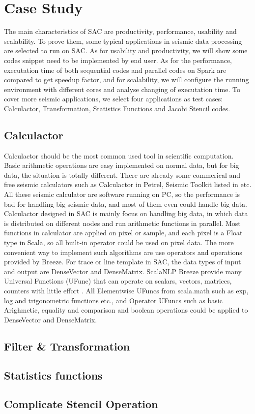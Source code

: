 \section{Case Study}
The main characteristics of SAC are productivity, performance, usability and scalability. To prove them, some typical applications in seismic data processing are selected to run on SAC. As for usability and productivity, we will show some codes snippet need to be implemented by end user. As for the performance, executation time of both sequential codes and parallel codes on Spark are compared to get speedup factor, and for scalability, we will configure the running environment with different cores and analyse changing of executation time. To cover more seismic applications, we select four applications as test cases: Calculactor, Transformation, Statistics Functions and Jacobi Stencil codes.

\subsection{Calculactor}
Calculactor should be the most common used tool in scientific computation. Basic arithmetic operations are easy implemented on normal data, but for big data, the situation is totally different. There are already some commerical and free seismic calculators such as Calculactor in Petrel, Seismic Toolkit listed in \cite{SeismicCalculator} etc. All these seismic calculator are software running on PC, so the performance is bad for handling big seismic data, and most of them even could handle big data. Calculactor designed in SAC is mainly focus on handling big data, in which data is distributed on different nodes and run arithmetic functions in parallel. Most functions in calculator are applied on pixel or sample, and each pixel is a Float type in Scala, so all built-in operator could be used on pixel data. The more convenient way to implement such algorithms are use operators and operations provided by Breeze. For trace or line template in SAC, the data types of input and output are DenseVector and DenseMatrix. ScalaNLP Breeze provide many Universal Functions (UFunc) that can operate on scalars, vectors, matrices, counters with little effort \cite{BreezeUFunc}. All Elementwise UFuncs from scala.math such as exp, log and trigonometric functions etc., and Operator UFuncs such as basic Arighmetic, equality and comparison and boolean operations could be applied to DenseVector and DenseMatrix.   


\subsection{Filter \& Transformation}

\subsection{Statistics functions}

\subsection{Complicate Stencil Operation}





